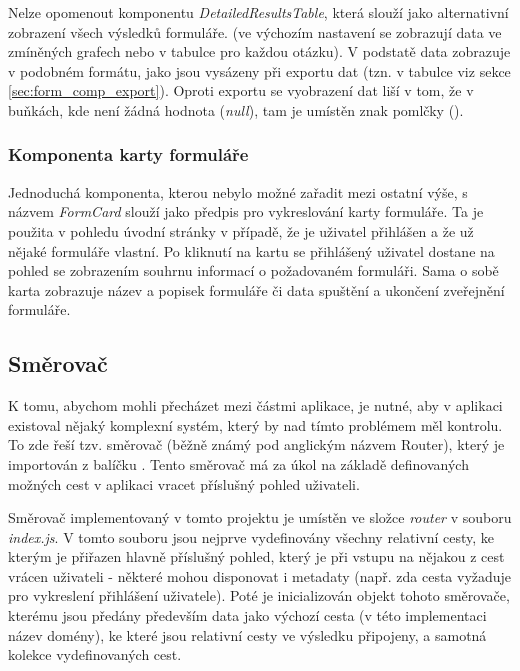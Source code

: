 		Nelze opomenout komponentu \textit{DetailedResultsTable}, která slouží jako alternativní zobrazení všech výsledků formuláře. (ve výchozím nastavení se zobrazují data ve zmíněných grafech nebo v tabulce pro každou otázku). V podstatě data zobrazuje v podobném formátu, jako jsou vysázeny při exportu dat (tzn. v tabulce viz sekce \ref{sec:form_comp_export}). Oproti exportu se vyobrazení dat liší v tom, že v buňkách, kde není žádná hodnota (\textit{null}), tam je umístěn znak pomlčky (\uv{-}).
		
		\subsubsection{Komponenta karty formuláře}
		Jednoduchá komponenta, kterou nebylo možné zařadit mezi ostatní výše, s názvem \textit{FormCard} slouží jako předpis pro vykreslování karty formuláře. Ta je použita v pohledu úvodní stránky v případě, že je uživatel přihlášen a že už nějaké formuláře vlastní. Po kliknutí na kartu se přihlášený uživatel dostane na pohled se zobrazením souhrnu informací o požadovaném formuláři. Sama o sobě karta zobrazuje název a popisek formuláře či data spuštění a ukončení zveřejnění formuláře.
	
	\subsection{Směrovač}\label{sec:fe_router} %
	K tomu, abychom mohli přecházet mezi částmi aplikace, je nutné, aby v aplikaci existoval nějaký komplexní systém, který by nad tímto problémem měl kontrolu. To zde řeší tzv. směrovač (běžně známý pod anglickým názvem Router), který je importován z balíčku . Tento směrovač má za úkol na základě definovaných možných cest v aplikaci vracet příslušný pohled uživateli.
	
	Směrovač implementovaný v tomto projektu je umístěn ve složce \textit{router} v souboru \textit{index.js}. V tomto souboru jsou nejprve vydefinovány všechny relativní cesty, ke kterým je přiřazen hlavně příslušný pohled, který je při vstupu na nějakou z cest vrácen uživateli - některé mohou disponovat i metadaty (např. zda cesta vyžaduje pro vykreslení přihlášení uživatele). Poté je inicializován objekt tohoto směrovače, kterému jsou předány především data jako výchozí cesta (v této implementaci název domény), ke které jsou relativní cesty ve výsledku připojeny, a samotná kolekce vydefinovaných cest. 
	
